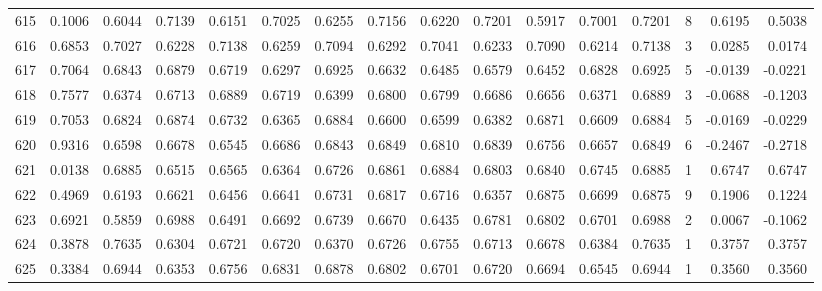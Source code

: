 \begin{tabular}{lrrrrrrrrrrrrrrr}
615 &      0.1006 &  0.6044 &  0.7139 &  0.6151 &  0.7025 &  0.6255 &  0.7156 &  0.6220 &  0.7201 &  0.5917 &   0.7001 &     0.7201 &      8 &                    0.6195 &                     0.5038 \\
616 &      0.6853 &  0.7027 &  0.6228 &  0.7138 &  0.6259 &  0.7094 &  0.6292 &  0.7041 &  0.6233 &  0.7090 &   0.6214 &     0.7138 &      3 &                    0.0285 &                     0.0174 \\
617 &      0.7064 &  0.6843 &  0.6879 &  0.6719 &  0.6297 &  0.6925 &  0.6632 &  0.6485 &  0.6579 &  0.6452 &   0.6828 &     0.6925 &      5 &                   -0.0139 &                    -0.0221 \\
618 &      0.7577 &  0.6374 &  0.6713 &  0.6889 &  0.6719 &  0.6399 &  0.6800 &  0.6799 &  0.6686 &  0.6656 &   0.6371 &     0.6889 &      3 &                   -0.0688 &                    -0.1203 \\
619 &      0.7053 &  0.6824 &  0.6874 &  0.6732 &  0.6365 &  0.6884 &  0.6600 &  0.6599 &  0.6382 &  0.6871 &   0.6609 &     0.6884 &      5 &                   -0.0169 &                    -0.0229 \\
620 &      0.9316 &  0.6598 &  0.6678 &  0.6545 &  0.6686 &  0.6843 &  0.6849 &  0.6810 &  0.6839 &  0.6756 &   0.6657 &     0.6849 &      6 &                   -0.2467 &                    -0.2718 \\
621 &      0.0138 &  0.6885 &  0.6515 &  0.6565 &  0.6364 &  0.6726 &  0.6861 &  0.6884 &  0.6803 &  0.6840 &   0.6745 &     0.6885 &      1 &                    0.6747 &                     0.6747 \\
622 &      0.4969 &  0.6193 &  0.6621 &  0.6456 &  0.6641 &  0.6731 &  0.6817 &  0.6716 &  0.6357 &  0.6875 &   0.6699 &     0.6875 &      9 &                    0.1906 &                     0.1224 \\
623 &      0.6921 &  0.5859 &  0.6988 &  0.6491 &  0.6692 &  0.6739 &  0.6670 &  0.6435 &  0.6781 &  0.6802 &   0.6701 &     0.6988 &      2 &                    0.0067 &                    -0.1062 \\
624 &      0.3878 &  0.7635 &  0.6304 &  0.6721 &  0.6720 &  0.6370 &  0.6726 &  0.6755 &  0.6713 &  0.6678 &   0.6384 &     0.7635 &      1 &                    0.3757 &                     0.3757 \\
625 &      0.3384 &  0.6944 &  0.6353 &  0.6756 &  0.6831 &  0.6878 &  0.6802 &  0.6701 &  0.6720 &  0.6694 &   0.6545 &     0.6944 &      1 &                    0.3560 &                     0.3560 \\

\end{tabular}
